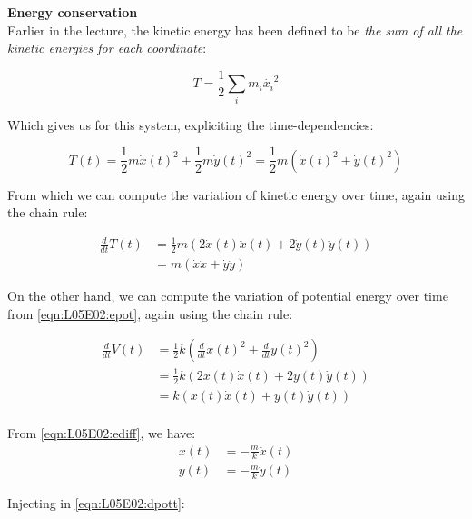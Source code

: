 \documentclass[solutions.tex]{subfiles}
\begin{document}
\hr
\textbf{Energy conservation}\ \\
Earlier in the lecture, the kinetic energy has been defined to be
\textit{the sum of all the kinetic energies for each coordinate}:

\begin{equation}
	T=\frac12\sum_i m_i \dot{x_i}^2
\end{equation}

Which gives us for this system, expliciting the time-dependencies:

\begin{equation}
	T(t)=\frac12 m \dot{x}(t)^2 + \frac12 m \dot{y}(t)^2=\frac12m(\dot{x}(t)^2+\dot{y}(t)^2)
\end{equation}

From which we can compute the variation of kinetic energy
over time, again using the chain rule:

\begin{equation}
	\label{eqn:L05E02:dkint}
	\begin{aligned}
		\frac{d}{dt}T(t) &= \frac12m(2\dot{x}(t)\ddot{x}(t)+2\dot{y}(t)\ddot{y}(t)) \\
		~ &= m(\dot{x}\ddot{x}+\dot{y}\ddot{y})
	\end{aligned}
\end{equation}

On the other hand, we can compute the variation of
potential energy over time from \eqref{eqn:L05E02:epot},
again using the chain rule:

\begin{equation}
	\label{eqn:L05E02:dpott}
	\begin{aligned}
		\frac{d}{dt}V(t) &= \frac12k(\frac{d}{dt}x(t)^2+\frac{d}{dt}y(t)^2) \\
		~ &= \frac12k(2x(t)\dot{x}(t)+2y(t)\dot{y}(t))\\
		~ &= k(x(t)\dot{x}(t)+y(t)\dot{y}(t))\\
	\end{aligned}
\end{equation}

From \eqref{eqn:L05E02:ediff}, we have:
\begin{equation}
	\begin{aligned}
		x(t) &= -\frac{m}{k}\ddot{x}(t) \\
		y(t) &= -\frac{m}{k}\ddot{y}(t)
	\end{aligned}
\end{equation}

Injecting in \eqref{eqn:L05E02:dpott}:
\end{document}
